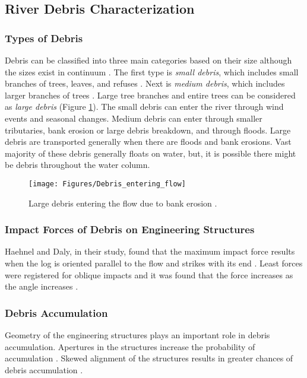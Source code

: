 \subsection{River Debris Characterization}
\subsubsection{Types of Debris}
Debris can be classified into three main categories based on their size although the sizes exist in continuum \cite{Reference1}. The first type is \textit{small debris}, which includes small branches of trees, leaves, and refuses \cite{Reference1}. Next is \textit{medium debris}, which includes larger branches of trees \cite{Reference1}. Large tree branches and entire trees can be considered as \textit{large debris} (Figure \ref{fig:Debris_entering_flow})\cite{Reference1}. The small debris can enter the river through wind events and seasonal changes. Medium debris can enter through smaller tributaries, bank erosion or large debris breakdown, and through floods. Large debris are transported generally when there are floods and bank erosions. Vast majority of these debris generally floats on water, but, it is possible there might be debris throughout the water column.
\begin{figure}
\centering
\texttt{[image: Figures/Debris\_entering\_flow]}
\caption{\label{fig:Debris_entering_flow}Large debris entering the flow due to bank erosion \cite{Reference1}.}
\end{figure}

\subsubsection{Impact Forces of Debris on Engineering Structures}
Haehnel and Daly, in their study, found that the maximum impact force results when the log is oriented parallel to the flow and strikes with its end \cite{Reference2}. Least forces were registered for oblique impacts and it was found that the force increases as the angle increases \cite{Reference2}. 
\subsubsection{Debris Accumulation}
Geometry of the engineering structures plays an important role in debris accumulation. Apertures in the structures increase the probability of accumulation \cite{Reference3}. Skewed alignment of the structures results in greater chances of debris accumulation \cite{Reference3}.

